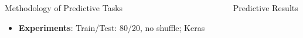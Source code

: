 \documentclass[final]{beamer}
\newlength{\sepwidth}
\newlength{\colwidth}
\newcommand{\separatorcolumn}{\begin{column}{\sepwidth}\end{column}}
\begin{document}
\begin{frame}[t]
\begin{columns}[t]
\begin{column}{\colwidth}
\begin{exampleblock}{\huge{Methodology of Predictive Tasks}}
{\begin{itemize}
                  1. Hourly split daily usage into 24 cols (labeled 0 - 23)\\
                  2. Lookback 3-5 time steps from the current timestamp\\
                  3. One-hot-encoding; Min-Max scaler
            \item \textbf{Experiments}: Train/Test: 80/20, no shuffle; Keras


          \end{itemize} }
      \end{exampleblock}

    \end{column}

    \separatorcolumn

    \begin{column}{\colwidth}

      \begin{block}
        {\huge{Predictive Results}}

        {
          \fontsize{37pt}{44.4pt} \selectfont {}}


\end{block}
\end{column}
\end{columns}
\end{frame}
\end{document}
